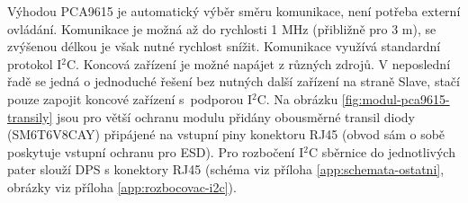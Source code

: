 Výhodou PCA9615 je automatický výběr směru komunikace, není potřeba externí ovládání. Komunikace je možná až do rychlosti 1 MHz (přibližně pro 3 m), se zvýšenou délkou je však nutné rychlost snížit. Komunikace využívá standardní protokol I$^2$C. Koncová zařízení je možné napájet z různých zdrojů. V neposlední řadě se jedná o jednoduché řešení bez nutných další zařízení na straně Slave, stačí pouze zapojit koncové zařízení s~podporou I$^2$C. Na obrázku \ref{fig:modul-pca9615-transily} jsou pro větší ochranu modulu přidány obousměrné transil diody (SM6T6V8CAY) připájené na vstupní piny konektoru RJ45 (obvod sám o sobě poskytuje vstupní ochranu pro ESD). Pro rozbočení I$^2$C sběrnice do jednotlivých pater slouží DPS s konektory RJ45 (schéma viz příloha \ref{app:schemata-ostatni}, obrázky viz příloha \ref{app:rozbocovac-i2c}).

